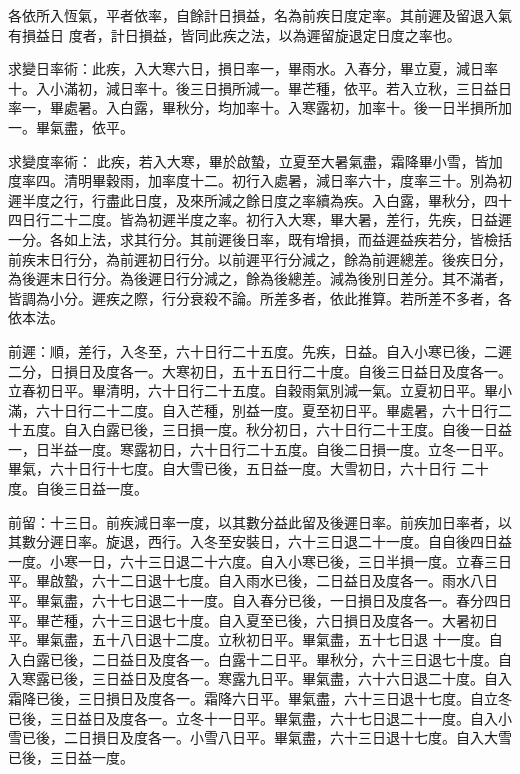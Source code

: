 \begin{pinyinscope}
 各依所入恆氣，平者依率，自餘計日損益，名為前疾日度定率。其前遲及留退入氣有損益日
 度者，計日損益，皆同此疾之法，以為遲留旋退定日度之率也。



 求變日率術：此疾，入大寒六日，損日率一，畢雨水。入春分，畢立夏，減日率十。入小滿初，減日率十。後三日損所減一。畢芒種，依平。若入立秋，三日益日率一，畢處暑。入白露，畢秋分，均加率十。入寒露初，加率十。後一日半損所加一。畢氣盡，依平。



 求變度率術：
 此疾，若入大寒，畢於啟蟄，立夏至大暑氣盡，霜降畢小雪，皆加度率四。清明畢穀雨，加率度十二。初行入處暑，減日率六十，度率三十。別為初遲半度之行，行盡此日度，及來所減之餘日度之率續為疾。入白露，畢秋分，四十四日行二十二度。皆為初遲半度之率。初行入大寒，畢大暑，差行，先疾，日益遲一分。各如上法，求其行分。其前遲後日率，既有增損，而益遲益疾若分，皆檢括前疾末日行分，為前遲初日行分。以前遲平行分減之，餘為前遲總差。後疾日分，為後遲末日行分。為後遲日行分減之，餘為後總差。減為後別日差分。其不滿者，皆調為小分。遲疾之際，行分衰殺不論。所差多者，依此推算。若所差不多者，各
 依本法。



 前遲：順，差行，入冬至，六十日行二十五度。先疾，日益。自入小寒已後，二遲二分，日損日及度各一。大寒初日，五十五日行二十度。自後三日益日及度各一。立春初日平。畢清明，六十日行二十五度。自穀雨氣別減一氣。立夏初日平。畢小滿，六十日行二十二度。自入芒種，別益一度。夏至初日平。畢處暑，六十日行二十五度。自入白露已後，三日損一度。秋分初日，六十日行二十王度。自後一日益一，日半益一度。寒露初日，六十日行二十五度。自後二日損一度。立冬一日平。畢氣，六十日行十七度。自大雪已後，五日益一度。大雪初日，六十日行
 二十度。自後三日益一度。



 前留：十三日。前疾減日率一度，以其數分益此留及後遲日率。前疾加日率者，以其數分遲日率。旋退，西行。入冬至安裝日，六十三日退二十一度。自自後四日益一度。小寒一日，六十三日退二十六度。自入小寒已後，三日半損一度。立春三日平。畢啟蟄，六十二日退十七度。自入雨水已後，二日益日及度各一。雨水八日平。畢氣盡，六十七日退二十一度。自入春分已後，一日損日及度各一。春分四日平。畢芒種，六十三日退七十度。自入夏至已後，六日損日及度各一。大暑初日平。畢氣盡，五十八日退十二度。立秋初日平。畢氣盡，五十七日退
 十一度。自入白露已後，二日益日及度各一。白露十二日平。畢秋分，六十三日退七十度。自入寒露已後，三日益日及度各一。寒露九日平。畢氣盡，六十六日退二十度。自入霜降已後，三日損日及度各一。霜降六日平。畢氣盡，六十三日退十七度。自立冬已後，三日益日及度各一。立冬十一日平。畢氣盡，六十七日退二十一度。自入小雪已後，二日損日及度各一。小雪八日平。畢氣盡，六十三日退十七度。自入大雪已後，三日益一度。




\end{pinyinscope}
